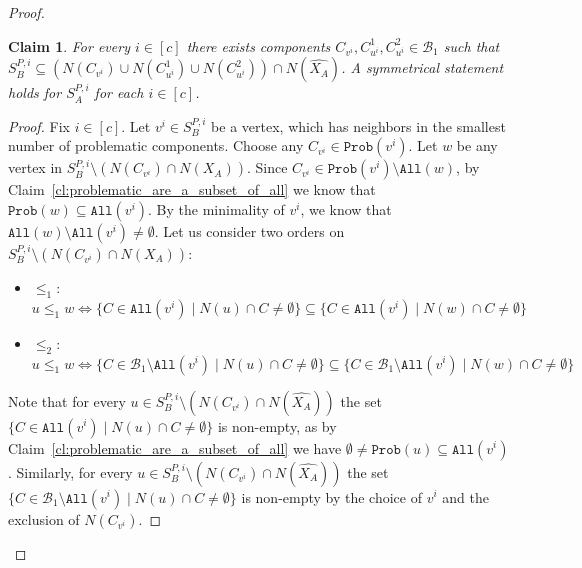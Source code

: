 \documentclass[11pt,a4paper]{article}
\newtheorem{claim}[theorem]{Claim}
\theoremstyle{definition}
\renewcommand{\varnothing}{\emptyset}
\begin{document}
\begin{proof}

\begin{claim}\label{cl:problematic_in_S}
    For every $i\in[c]$ there exists components $C_{v^i}, C_{u^i}^1, C_{u^i}^2\in 
    \mathcal{B}_1$ such that \linebreak $S_B^{P,i} \subseteq \left(N(C_{v^i})\cup N(C_{u^i}^1)\cup N(C_{u^i}^2)\right)\cap N(\widehat{X_A})$.
    A symmetrical statement holds for $S_A^{P,i}$ for each $i\in [c]$.
\end{claim}
\begin{proof}
    Fix $i\in [c]$. Let ${v^i}\in S_B^{P,i}$ be a vertex, which has neighbors in the smallest number of problematic components. Choose any $C_{v^i}\in \texttt{Prob}(v^i)$.
    Let $w$ be any vertex in $S_B^{P,i}\setminus (N(C_{v^i}) \cap N(X_A))$. Since $C_{v^i}\in \texttt{Prob}({v^i})\setminus \texttt{All}(w)$, by Claim~\ref{cl:problematic_are_a_subset_of_all} we know that $\texttt{Prob}(w)\subseteq \texttt{All}({v^i})$. By the minimality of ${v^i}$, we know that $\texttt{All}(w)\setminus \texttt{All}({v^i})\neq \varnothing$. Let us consider two orders on $S_B^{P,i}\setminus (N(C_{v^i}) \cap N(X_A))$:
    \begin{itemize}
        \item $\leq_1:$ $u\leq_1 w \Leftrightarrow \{C\in \texttt{All}({v^i})\mid N(u)\cap C\neq \varnothing\} \subseteq \{C\in \texttt{All}({v^i})\mid N(w)\cap C\neq \varnothing\} $
        \item $\leq_2:$ $u\leq_1 w \Leftrightarrow \{C\in \mathcal{B}_1\setminus \texttt{All}({v^i})\mid N(u)\cap C\neq \varnothing\} \subseteq \{C\in \mathcal{B}_1\setminus \texttt{All}({v^i})\mid N(w)\cap C\neq \varnothing\} $
    \end{itemize}
    Note that for every $u\in S_B^{P,i}\setminus (N(C_{v^i}) \cap N(\widehat{X_A}))$ the set $\{C\in \texttt{All}({v^i})\mid N(u)\cap C\neq \varnothing\}$ is non-empty, as by 
    Claim~\ref{cl:problematic_are_a_subset_of_all} we have $\emptyset \neq \texttt{Prob}(u)\subseteq \texttt{All}({v^i})$. Similarly, for every $u\in S_B^{P,i}\setminus (N(C_{v^i}) \cap N(\widehat{X_A}))$ the set $\{C\in \mathcal{B}_1 \setminus \texttt{All}({v^i})\mid N(u)\cap C\neq \varnothing\}$ is non-empty by the choice of ${v^i}$ and the exclusion of $N(C_{v^i})$. 
    

\end{proof}
\end{proof}
\end{document}
